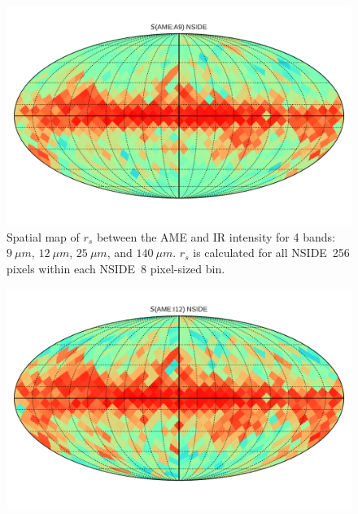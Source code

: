       \begin{figure}
        \includegraphics[width=\textwidth]{../Plots/Allsky_Corr/Spearman_Map_nside8_AMEtoA9.pdf}
        \centering
        \caption{Spatial map of $r_{s}$ between the AME and IR intensity for 4 bands:$9~\mu{}m$, $12~\mu{}m$, $25~\mu{}m$, and $140~\mu{}m$. $r_{s}$ is calculated for all NSIDE~256 pixels within each NSIDE~8 pixel-sized bin.}
        \label{fig:Spearman_Map_nside8_AMEtoIR_A9}
      \end{figure}

      \begin{figure}

        \includegraphics[width=\textwidth]{../Plots/Allsky_Corr/Spearman_Map_nside8_AMEtoI12.pdf}
        \centering
        \caption{}
        \label{fig:Spearman_Map_nside8_AMEtoIR_I12}
      \end{figure}

